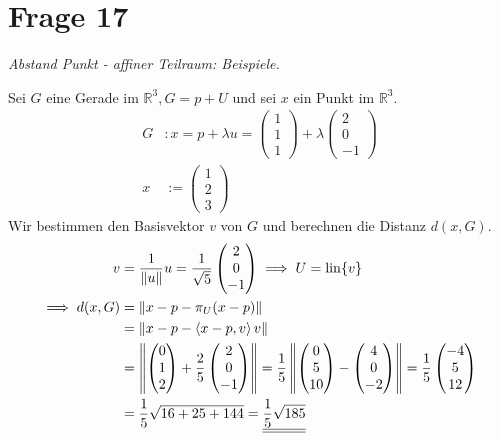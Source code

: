 \section{Frage 17}
\textit{Abstand Punkt - affiner Teilraum: Beispiele.}
\begin{example}
    Sei $G$ eine Gerade im $\mathbb{R}^3, G= p + U$ und sei $x$ ein Punkt im $\mathbb{R}^3$.
    \begin{align*}
        G &: x = p + \lambda u = \begin{pmatrix}
            1\\1\\1
        \end{pmatrix} + \lambda \begin{pmatrix}
            2\\0\\-1
        \end{pmatrix}\\
        x &:= \begin{pmatrix}
            1\\2\\3
        \end{pmatrix}
    \end{align*}
    Wir bestimmen den Basisvektor $v$ von $G$ und berechnen die Distanz $d(x,G)$.
    \begin{align*}
        v &= \frac{1}{\left\lVert u \right\rVert}u = \frac{1}{\sqrt{5}}\begin{pmatrix}
            2\\0\\-1
        \end{pmatrix} \implies U = \mathrm{lin}\{v\}\\
        \implies d(x,G) &= \left\lVert x-p-\pi_U(x-p) \right\rVert\\
        &= \left\lVert x -p - \left\langle x-p,v \right\rangle v \right\rVert\\
        &= \left\lVert \begin{pmatrix}
            0\\1\\2
        \end{pmatrix}+\frac{2}{5}\begin{pmatrix}
            2\\0\\-1
        \end{pmatrix} \right\rVert = \frac{1}{5}\left\lVert \begin{pmatrix}
            0\\5\\10
        \end{pmatrix} - \begin{pmatrix}
            4\\0\\-2
        \end{pmatrix} \right\rVert = \frac{1}{5}\begin{pmatrix}
            -4\\5\\12
        \end{pmatrix}\\
        &= \frac{1}{5}\sqrt{16 + 25 + 144} = \underline{\underline{\frac{1}{5}\sqrt{185}}}
    \end{align*}
\end{example}
